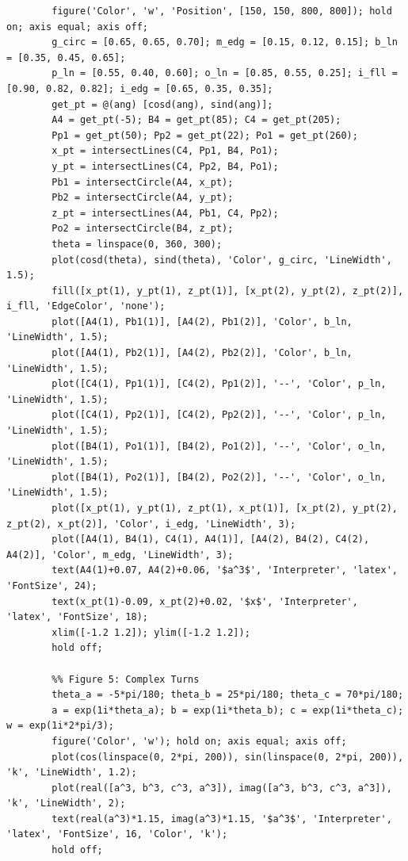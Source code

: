 \documentclass{amsart}
\begin{document}
\begin{lstlisting}[caption={Geometric simulation and plotting script}]
		%% Figure 4: Unit Circle Chord Intersections
		figure('Color', 'w', 'Position', [150, 150, 800, 800]); hold on; axis equal; axis off;
		g_circ = [0.65, 0.65, 0.70]; m_edg = [0.15, 0.12, 0.15]; b_ln = [0.35, 0.45, 0.65];
		p_ln = [0.55, 0.40, 0.60]; o_ln = [0.85, 0.55, 0.25]; i_fll = [0.90, 0.82, 0.82]; i_edg = [0.65, 0.35, 0.35];
		get_pt = @(ang) [cosd(ang), sind(ang)];
		A4 = get_pt(-5); B4 = get_pt(85); C4 = get_pt(205);
		Pp1 = get_pt(50); Pp2 = get_pt(22); Po1 = get_pt(260);
		x_pt = intersectLines(C4, Pp1, B4, Po1);
		y_pt = intersectLines(C4, Pp2, B4, Po1);
		Pb1 = intersectCircle(A4, x_pt);
		Pb2 = intersectCircle(A4, y_pt);
		z_pt = intersectLines(A4, Pb1, C4, Pp2);
		Po2 = intersectCircle(B4, z_pt);
		theta = linspace(0, 360, 300);
		plot(cosd(theta), sind(theta), 'Color', g_circ, 'LineWidth', 1.5);
		fill([x_pt(1), y_pt(1), z_pt(1)], [x_pt(2), y_pt(2), z_pt(2)], i_fll, 'EdgeColor', 'none');
		plot([A4(1), Pb1(1)], [A4(2), Pb1(2)], 'Color', b_ln, 'LineWidth', 1.5);
		plot([A4(1), Pb2(1)], [A4(2), Pb2(2)], 'Color', b_ln, 'LineWidth', 1.5);
		plot([C4(1), Pp1(1)], [C4(2), Pp1(2)], '--', 'Color', p_ln, 'LineWidth', 1.5);
		plot([C4(1), Pp2(1)], [C4(2), Pp2(2)], '--', 'Color', p_ln, 'LineWidth', 1.5);
		plot([B4(1), Po1(1)], [B4(2), Po1(2)], '--', 'Color', o_ln, 'LineWidth', 1.5);
		plot([B4(1), Po2(1)], [B4(2), Po2(2)], '--', 'Color', o_ln, 'LineWidth', 1.5);
		plot([x_pt(1), y_pt(1), z_pt(1), x_pt(1)], [x_pt(2), y_pt(2), z_pt(2), x_pt(2)], 'Color', i_edg, 'LineWidth', 3);
		plot([A4(1), B4(1), C4(1), A4(1)], [A4(2), B4(2), C4(2), A4(2)], 'Color', m_edg, 'LineWidth', 3);
		text(A4(1)+0.07, A4(2)+0.06, '$a^3$', 'Interpreter', 'latex', 'FontSize', 24);
		text(x_pt(1)-0.09, x_pt(2)+0.02, '$x$', 'Interpreter', 'latex', 'FontSize', 18);
		xlim([-1.2 1.2]); ylim([-1.2 1.2]);
		hold off;
		
		%% Figure 5: Complex Turns
		theta_a = -5*pi/180; theta_b = 25*pi/180; theta_c = 70*pi/180;
		a = exp(1i*theta_a); b = exp(1i*theta_b); c = exp(1i*theta_c); w = exp(1i*2*pi/3);
		figure('Color', 'w'); hold on; axis equal; axis off;
		plot(cos(linspace(0, 2*pi, 200)), sin(linspace(0, 2*pi, 200)), 'k', 'LineWidth', 1.2);
		plot(real([a^3, b^3, c^3, a^3]), imag([a^3, b^3, c^3, a^3]), 'k', 'LineWidth', 2);
		text(real(a^3)*1.15, imag(a^3)*1.15, '$a^3$', 'Interpreter', 'latex', 'FontSize', 16, 'Color', 'k');
		hold off;
		

\end{lstlisting}
\end{document}

